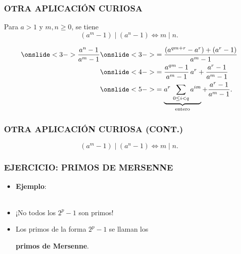 \begin{frame}
  \frametitle{OTRA APLICACIÓN CURIOSA}
  \begin{framed}
    Para $a > 1$ y $m, n \ge 0$, se tiene
    $$(a^m - 1) \mid (a^n-1) \iff m \mid n.$$
  \end{framed}


  \begin{align*}
    \onslide<3->{\frac{a^n-1}{a^m-1}} & \onslide<3->{= \frac{(a^{qm + r} - a^r) + (a^r - 1)}{a^m - 1}} \\
                        & \onslide<4->{= \frac{a^{qm} - 1}{a^m - 1}\,a^r + \frac{a^r - 1}{a^m - 1}} \\
                        & \onslide<5->{= \underbrace{a^r \, \sum_{0 \le i < q} a^{im}}_{\text{entero}} + \frac{a^r - 1}{a^m - 1}.}
  \end{align*}
\end{frame}

\begin{frame}
  \frametitle{OTRA APLICACIÓN CURIOSA (CONT.)}
  \begin{framed}
    $$(a^m - 1) \mid (a^n-1) \iff m \mid n.$$
  \end{framed}
\end{frame}

\begin{frame}
  \frametitle{EJERCICIO: PRIMOS DE MERSENNE}


  \begin{itemize}
  \item<3-> \textbf{Ejemplo}:
     \\
     \\

  \item<7-> ¡No todos los $2^p - 1$ son primos!


  \item<9-> Los primos de la forma $2^p - 1$ se llaman los

    \textbf{primos de Mersenne}.
  \end{itemize}
\end{frame}

